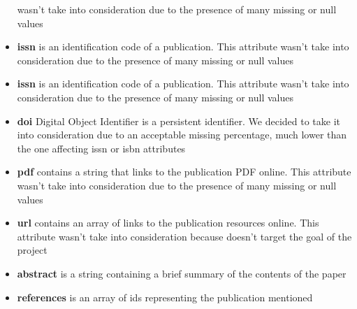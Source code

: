 \documentclass{Configuration_Files/PoliMi3i_thesis}
\begin{document}
\begin{itemize}
            wasn't take into consideration due to the presence of many missing or null values
    \item \textbf{issn} is an identification code of a publication. This attribute wasn't take into consideration due
            to the presence of many missing or null values
    \item \textbf{issn} is an identification code of a publication. This attribute wasn't take into consideration due
            to the presence of many missing or null values
    \item \textbf{doi} Digital Object Identifier is a persistent identifier. We decided to take it into consideration
            due to an acceptable missing percentage, much lower than the one affecting issn or isbn attributes
    \item \textbf{pdf} contains a string that links to the publication PDF online. This attribute wasn't take into
            consideration due to the presence of many missing or null values
    \item \textbf{url} contains an array of links to the publication resources online. This attribute wasn't take into
            consideration because doesn't target the goal of the project
    \item \textbf{abstract} is a string containing a brief summary of the contents of the paper
    \item \textbf{references} is an array of ids representing the publication mentioned
\end{itemize}
\bigskip
\end{document}

